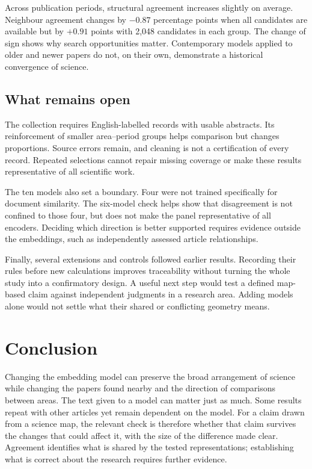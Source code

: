 Across publication periods, structural agreement increases slightly on average. Neighbour agreement changes by $-0.87$ percentage points when all candidates are available but by $+0.91$ points with 2,048 candidates in each group. The change of sign shows why search opportunities matter. Contemporary models applied to older and newer papers do not, on their own, demonstrate a historical convergence of science.

\subsection{What remains open}
The collection requires English-labelled records with usable abstracts. Its reinforcement of smaller area--period groups helps comparison but changes proportions. Source errors remain, and cleaning is not a certification of every record. Repeated selections cannot repair missing coverage or make these results representative of all scientific work.

The ten models also set a boundary. Four were not trained specifically for document similarity. The six-model check helps show that disagreement is not confined to those four, but does not make the panel representative of all encoders. Deciding which direction is better supported requires evidence outside the embeddings, such as independently assessed article relationships.

Finally, several extensions and controls followed earlier results. Recording their rules before new calculations improves traceability without turning the whole study into a confirmatory design. A useful next step would test a defined map-based claim against independent judgments in a research area. Adding models alone would not settle what their shared or conflicting geometry means.

\section{Conclusion}
Changing the embedding model can preserve the broad arrangement of science while changing the papers found nearby and the direction of comparisons between areas. The text given to a model can matter just as much. Some results repeat with other articles yet remain dependent on the model. For a claim drawn from a science map, the relevant check is therefore whether that claim survives the changes that could affect it, with the size of the difference made clear. Agreement identifies what is shared by the tested representations; establishing what is correct about the research requires further evidence.
